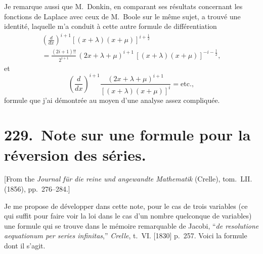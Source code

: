 \documentclass[11pt,a4paper]{book}
\begin{document}
Je remarque aussi que M.~Donkin, en comparant ses r\'{e}sultats concernant les fonctions de Laplace avec ceux de M.~Boole sur le m\^{e}me sujet, a trouv\'{e} une identit\'{e}, laquelle m'a conduit \`{a} cette autre formule de diff\'{e}rentiation
\begin{multline}
\left(\frac{d}{dx}\right)^{i+1}[(x+\lambda)(x+\mu)]^{i+\frac{1}{2}}\\
=\frac{(2i+1)!!}{2^{i+1}}\,(2x+\lambda+\mu)^{i+1}\,[(x+\lambda)(x+\mu)]^{-i-\frac{1}{2}},
\end{multline}
et
\begin{equation}
\left(\frac{d}{dx}\right)^{i+1}\frac{(2x+\lambda+\mu)^{i+1}}{[(x+\lambda)(x+\mu)]^{i}}=\text{etc.},
\end{equation}
formule que j'ai d\'{e}montr\'{e}e au moyen d'une analyse assez compliqu\'{e}e.
\newpage

\chapter[Note sur une formule pour la r\'{e}version des s\'{e}ries]{229.\ Note sur une formule pour la r\'{e}version des s\'{e}ries.}
\label{paper229}

\begin{center}
\small
[From the \textit{Journal f\"{u}r die reine und angewandte Mathematik} (Crelle), tom.~LII. (1856), pp.~276--284.]
\end{center}

\bigskip

Je me propose de d\'{e}velopper dans cette note, pour le cas de trois variables (ce qui suffit pour faire voir la loi dans le cas d'un nombre quelconque de variables) une formule qui se trouve dans le m\'{e}moire remarquable de Jacobi, ``\textit{de resolutione aequationum per series infinitas},'' \textit{Crelle}, t.~VI. [1830] p.~257. Voici la formule dont il s'agit.
\end{document}
